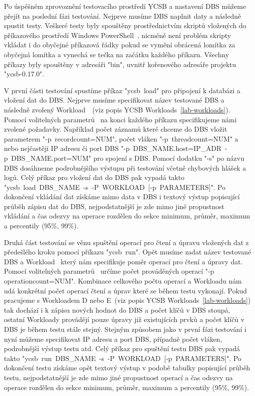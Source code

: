 \documentclass[czech,master,dept460,male,csharp,cpdeclaration]{diploma}
\begin{document}
	Po úspěšném zprovoznění testovacího prostředí YCSB a nastavení DBS můžeme přejít na poslední fázi testování. Nejprve musíme DBS naplnit daty a následně spustit testy. Veškeré testy byly spouštěny prostřednictvím skriptů vložených do příkazového prostředí Windows PowerShell~\cite{win-powershell}, nicméně není problém skripty vkládat i do obyčejné příkazová řádky pokud se vymění obrácená lomítka za obyčejná lomítka a vynechá se tečka na začátku každého příkazu. Všechny příkazy byly spouštěny v adresáři "bin", uvnitř kořenového adresáře projektu "ycsb-0.17.0".
	
	V první části testování spustíme příkaz "ycsb~load" pro připojení k databázi a vložení dat do DBS. Nejprve musíme specifikovat název testované DBS a následně zvolený Workload~\cite{workloads}~(viz popis YCSB Workloads~\ref{lab-workloads}). Pomocí volitelných parametrů~\cite{ycsb-properties} na konci každého příkazu specifikujeme námi zvolené požadavky. Například počet záznamů které chceme do DBS vložit parametrem "-p~recordcount=NUM", počet vláken "-p~threadcount=NUM" a nebo nejčastěji IP adresu či port DBS "-p~DBS\_NAME.host=IP\_ADR~-p~DBS\_NAME.port=NUM" pro spojení s DBS. Pomocí dodatku "-s" po názvu DBS dosáhneme podrobnějšího výstupu při testování včetně chybových hlášek a logů. Celý příkaz pro vložení dat do DBS pak vypadá takto "ycsb~load~DBS\_NAME~-s~-P~WORKLOAD~[-p~PARAMETERS]". Po dokončení vkládání dat získáme mimo data v DBS i textový výstup popisující průběh zápisu dat do DBS, nejpodstatnější je zde mimo jiné propustnost vkládání a čas odezvy na operace rozdělen do sekce minimum, průměr, maximum a percentily (95\%, 99\%).
	
	Druhá část testování se věnu spuštění operací pro čtení a úpravu vložených dat z předešlého kroku pomocí příkazu "ycsb~run". Opět musíme zadat název testované DBS a Workload~\cite{workloads} který nám specifikuje poměr operací pro čtení a úpravy dat. Pomocí volitelných parametrů~\cite{ycsb-properties} určíme počet prováděných operací "-p operationcount=NUM". Kombinace celkového počtu operací a Workloadu nám udá konkrétní počet operací čtení a úprav které se během testu vykonají. Pokud pracujeme s Workloadem D nebo E~(viz popis YCSB Workloads~\ref{lab-workloads}) tak dochází i k zápisu nových hodnot do DBS a počet klíčů v DBS stoupá, ostatní Workloady provádějí pouze úpravy již existujících prvků a počet klíčů v DBS je během testu stále stejný. Stejným způsobem jako v první fázi testování i nyní můžeme specifikovat IP adresu a port DBS, případně počet vláken, podrobnější výstup testu atd. Celý příkaz pro spuštění testu DBS pak vypadá takto "ycsb~run~DBS\_NAME~-s~-P~WORKLOAD~[-p~PARAMETERS]". Po dokončení testu získáme opět textový výstup v podobě tabulky popisující průběh testu, nejpodstatnější je zde mimo jiné propustnost operací a čas odezvy na operace rozdělen do sekce minimum, průměr, maximum a percentily (95\%, 99\%).
	
\end{document}

